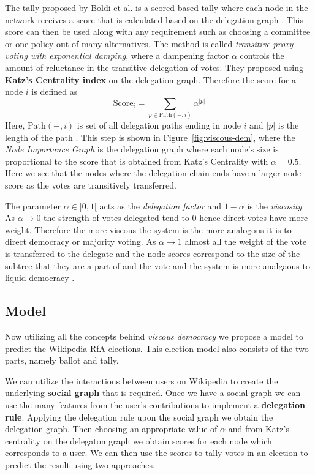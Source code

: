 The tally proposed by Boldi et al. is a scored based tally where each node in the network receives a score that is calculated based on the delegation graph \cite{ViscousDemocracy}. This score can then be used along with any requirement such as choosing a committee or one policy out of many alternatives. The method is called \textit{transitive proxy voting with exponential damping}, where a dampening factor $\alpha$ controls the amount of reluctance in the transitive delegation of votes. They proposed using \textbf{Katz's Centrality index} on the delegation graph. Therefore the score for a node $i$ is defined as 
\[\text{Score}_{i}  = \sum_{p \in \text{Path}(-,i)} \alpha^{|p|}\]
Here, $\text{Path}(-,i)$ is set of all delegation paths ending in node $i$ and $|p|$ is the length of the path \cite{ViscousDemocracy}. This step is shown in Figure~\ref{fig:viscous-dem}, where the \textit{Node Importance Graph} is the delegation graph where each node's size is proportional to the score that is obtained from Katz's Centrality with $\alpha=0.5$. Here we see that the nodes where the delegation chain ends have a larger node score as the votes are transitively transferred.
\smallskip

The parameter $\alpha\in ]0,1[$ acts as the \textit{delegation factor} and $1-\alpha$ is the \textit{viscosity}. As $\alpha\rightarrow 0$ the strength of votes delegated tend to $0$ hence direct votes have more weight. Therefore the more viscous the system is the more analogous it is to direct democracy or majority voting. As $\alpha\rightarrow 1$ almost all the weight of the vote is transferred to the delegate and the node scores correspond to the size of the subtree that they are a part of and the vote and the system is more analgaous to liquid democracy \cite{ViscousDemocracy}.

\subsection{Model} 
Now utilizing all the concepts behind \textit{viscous democracy} we propose a model to predict the Wikipedia RfA elections. This election model also consists of the two parts, namely ballot and tally. 
\smallskip

We can utilize the interactions between users on Wikipedia to create the underlying \textbf{social graph} that is required. Once we have a social graph we can use the many features from the user's contributions to implement a \textbf{delegation rule}. Applying the delegation rule upon the social graph we obtain the delegation graph. Then choosing an appropriate value of $\alpha$ and from Katz's centrality on the delegaton graph we obtain scores for each node which corresponds to a user. We can then use the scores to tally votes in an election to predict the result using two approaches.
\smallskip

